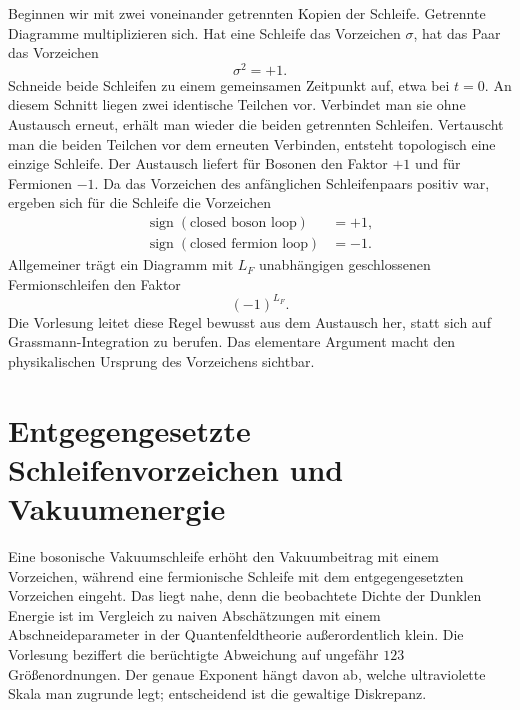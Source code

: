 Beginnen wir mit zwei voneinander getrennten Kopien der Schleife. Getrennte Diagramme multiplizieren sich. Hat eine Schleife das Vorzeichen \(\sigma\), hat das Paar das Vorzeichen
\begin{equation}
\sigma^2=+1.
\end{equation}
Schneide beide Schleifen zu einem gemeinsamen Zeitpunkt auf, etwa bei \(t=0\). An diesem Schnitt liegen zwei identische Teilchen vor. Verbindet man sie ohne Austausch erneut, erhält man wieder die beiden getrennten Schleifen. Vertauscht man die beiden Teilchen vor dem erneuten Verbinden, entsteht topologisch eine einzige Schleife. Der Austausch liefert für Bosonen den Faktor \(+1\) und für Fermionen \(-1\). Da das Vorzeichen des anfänglichen Schleifenpaars positiv war, ergeben sich für die Schleife die Vorzeichen
\begin{equation}
\begin{aligned}
\operatorname{sign}(\text{closed boson loop})&=+1,\\
\operatorname{sign}(\text{closed fermion loop})&=-1.
\end{aligned}
\end{equation}
Allgemeiner trägt ein Diagramm mit \(L_F\) unabhängigen geschlossenen Fermionschleifen den Faktor
\begin{equation}
(-1)^{L_F}.
\end{equation}
Die Vorlesung leitet diese Regel bewusst aus dem Austausch her, statt sich auf Grassmann-Integration zu berufen. Das elementare Argument macht den physikalischen Ursprung des Vorzeichens sichtbar.

\section{Entgegengesetzte Schleifenvorzeichen und Vakuumenergie}

Eine bosonische Vakuumschleife erhöht den Vakuumbeitrag mit einem Vorzeichen, während eine fermionische Schleife mit dem entgegengesetzten Vorzeichen eingeht. Das liegt nahe, denn die beobachtete Dichte der Dunklen Energie ist im Vergleich zu naiven Abschätzungen mit einem Abschneideparameter in der Quantenfeldtheorie außerordentlich klein. Die Vorlesung beziffert die berüchtigte Abweichung auf ungefähr \(123\) Größenordnungen. Der genaue Exponent hängt davon ab, welche ultraviolette Skala man zugrunde legt; entscheidend ist die gewaltige Diskrepanz.

